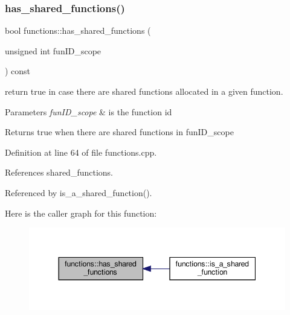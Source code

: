 \subsubsection{\texorpdfstring{has\+\_\+shared\+\_\+functions()}{has\_shared\_functions()}}
{\footnotesize\ttfamily bool functions\+::has\+\_\+shared\+\_\+functions (\begin{DoxyParamCaption}\item[{unsigned int}]{fun\+I\+D\+\_\+scope }\end{DoxyParamCaption}) const}



return true in case there are shared functions allocated in a given function. 


\begin{DoxyParams}{Parameters}
{\em fun\+I\+D\+\_\+scope} & is the function id \\
\hline
\end{DoxyParams}
\begin{DoxyReturn}{Returns}
true when there are shared functions in fun\+I\+D\+\_\+scope 
\end{DoxyReturn}


Definition at line 64 of file functions.\+cpp.



References shared\+\_\+functions.



Referenced by is\+\_\+a\+\_\+shared\+\_\+function().

Here is the caller graph for this function\+:
\nopagebreak
\begin{figure}[H]
\begin{center}
\leavevmode
\includegraphics[width=344pt]{dd/d03/classfunctions_ae65e0b90457b7af2ed1af8f093797e64_icgraph}
\end{center}
\end{figure}
\mbox{\label{classfunctions_a01a8c5e566f31f6b3a4f36c9bc9e979b}} 
